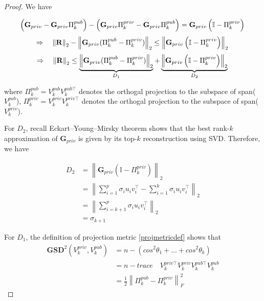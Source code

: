 \documentclass[11pt]{article}
\begin{document}
\begin{proof} We have

\begin{equation}
\left(\mathbf{G}_{p r i v}-\mathbf{G}_{p r i v} \Pi_k^{pub}\right) -  \left(\mathbf{G}_{p r i v}\Pi_k^{priv}-\mathbf{G}_{p r i v} \Pi_k^{pub}\right) = \mathbf{G}_{p r i v}\left(\mathbb{I} - \Pi_k^{priv}\right) \\
\end{equation}
\begin{equation}
\Rightarrow \quad\left\| \mathbf{R} \right\|_2 - \left\| \mathbf{G}_{p r i v} (\Pi_k^{pub} - \Pi_k^{priv}) \right\|_2 \le \left\| \mathbf{G}_{p r i v}\left(\mathbb{I} - \Pi_k^{priv}\right)\right\|_2 \\
\end{equation}
\begin{equation}
\Rightarrow \quad\left\| \mathbf{R} \right\|_2 \le \underbrace{\left\| \mathbf{G}_{p r i v} (\Pi_k^{pub} - \Pi_k^{priv}) \right\|_2}_{D_1} + \underbrace{\left\| \mathbf{G}_{p r i v}\left(\mathbb{I} - \Pi_k^{priv}\right)\right\|_2}_{D_2} \\
\end{equation}

where $\Pi_k^{pub} = V_k^{p u b} V_k^{p u b \top}$ denotes the orthogal projection to the subspace of span($V_k^{p u b}$), $\Pi_k^{priv} = V_k^{priv} V_k^{priv \top}$ denotes the orthogal projection to the subspace of span($V_k^{priv}$).

For $D_2$, recall Eckart–Young–Mirsky theorem \cite{young} shows that the best rank-$k$ approximation of $\mathbf{G}_{p r i v}$ is given by its top-$k$ reconstruction using SVD. Therefore, we have

\begin{equation}
\begin{aligned}
    D_2 &= \left\| \mathbf{G}_{p r i v}\left(\mathbb{I} - \Pi_k^{priv}\right)\right\|_2 \\
    & = \left\|\sum_{i=1}^p \sigma_i u_i v_i^{\top}-\sum_{i=1}^k \sigma_i u_i v_i^{\top}\right\|_2 \\
    & =\left\|\sum_{i=k+1}^p \sigma_i u_i v_i^{\top}\right\|_2 \\
    & = \sigma_{k + 1}
\end{aligned}
\end{equation}

For $D_1$, the definition of projection metric \ref{projmetricdef} shows that
\begin{equation}
\begin{aligned}
    \mathbf{GSD}^2(V_k^{priv}, V_k^{p u b}) & = n - (cos^2\theta_1 + ... + cos^2\theta_k) \\
    & = n - trace \quad V_k^{priv \top}V_k^{priv}V_k^{p u b \top} V_k^{p u b} \\
    & = \frac{1}{2} \left\| \Pi_k^{pub} - \Pi_k^{priv} \right\|_F^2
\end{aligned}
\end{equation}


\end{proof}
\end{document}
